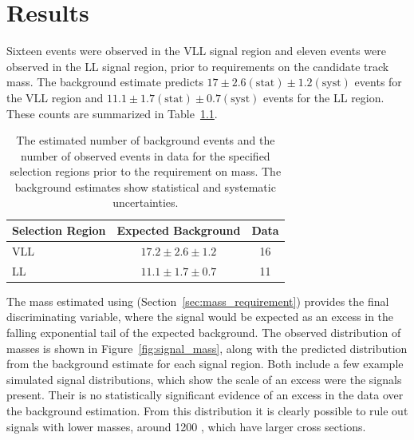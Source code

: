\chapter{Results}

\label{ch:results}

Sixteen events were observed in the \ac{VLL} signal region and eleven events were observed in the \ac{LL} signal region, prior to requirements on the candidate track mass.
The background estimate predicts $17 \pm 2.6 (\mathrm{stat}) \pm 1.2 (\mathrm{syst})$ events for the \ac{VLL} region and $11.1 \pm 1.7 (\mathrm{stat}) \pm 0.7 (\mathrm{syst})$ events for the \ac{LL} region. 
These counts are summarized in Table~\ref{tab:yields}.

\begin{table}
  \begin{center}
  \begin{tabular}{lcc}
  \hline
  Selection Region & Expected Background & Data \\
  \hline
  \ac{VLL}     & $17.2 \pm 2.6 \pm 1.2$ & 16 \\
  \ac{LL} & $11.1 \pm 1.7 \pm 0.7$ & 11 \\
  \hline
  \end{tabular}
  \end{center}
  \caption{The estimated number of background events and the number of observed events in data for the specified selection regions prior to the requirement on mass. The background estimates show statistical and systematic uncertainties.}
  \label{tab:yields}
\end{table}

The mass estimated using \dedx (Section~\ref{sec:mass_requirement}) provides the final discriminating variable, where the signal would be expected as an excess in the falling exponential tail of the expected background.
The observed distribution of masses is shown in Figure~\ref{fig:signal_mass}, along with the predicted distribution from the background estimate for each signal region.
Both include a few example simulated signal distributions, which show the scale of an excess were the \rhadron signals present.
Their is no statistically significant evidence of an excess in the data over the background estimation.
From this distribution it is clearly possible to rule out signals with lower masses, around 1200 \GeV, which have larger cross sections.

